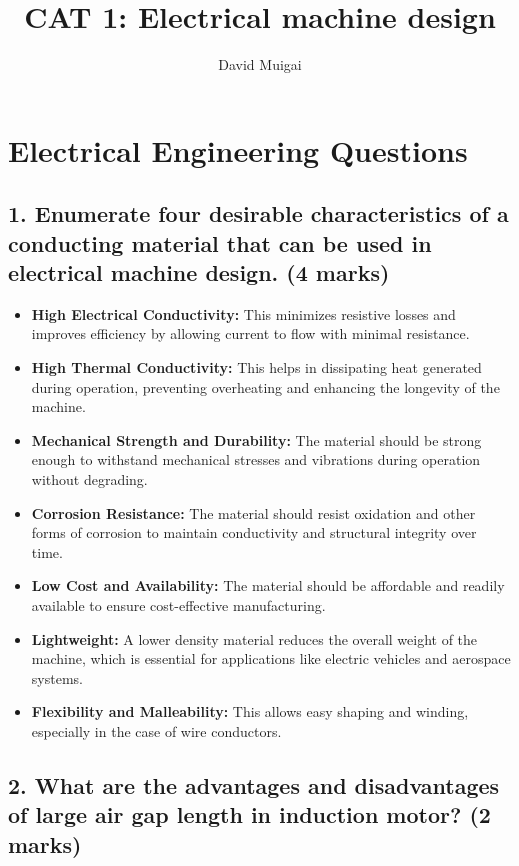 \documentclass[12pt]{article}
\title{CAT 1: Electrical machine design} %
\author{David Muigai} %
\begin{document}
	
	\maketitle


\section*{Electrical Engineering Questions}

\subsection*{\textbf{1.} Enumerate four desirable characteristics of a conducting material that can be used in electrical machine design. \textbf{(4 marks)}}
\begin{itemize}
	\item \textbf{High Electrical Conductivity:} This minimizes resistive losses and improves efficiency by allowing current to flow with minimal resistance.
	\item \textbf{High Thermal Conductivity:} This helps in dissipating heat generated during operation, preventing overheating and enhancing the longevity of the machine.
	\item \textbf{Mechanical Strength and Durability:} The material should be strong enough to withstand mechanical stresses and vibrations during operation without degrading.
	\item \textbf{Corrosion Resistance:} The material should resist oxidation and other forms of corrosion to maintain conductivity and structural integrity over time.
	\item \textbf{Low Cost and Availability:} The material should be affordable and readily available to ensure cost-effective manufacturing.
	\item \textbf{Lightweight:} A lower density material reduces the overall weight of the machine, which is essential for applications like electric vehicles and aerospace systems.
	\item \textbf{Flexibility and Malleability:} This allows easy shaping and winding, especially in the case of wire conductors.
\end{itemize}


\subsection*{\textbf{2.} What are the advantages and disadvantages of large air gap length in induction motor? \textbf{(2 marks)}}
\end{document}
